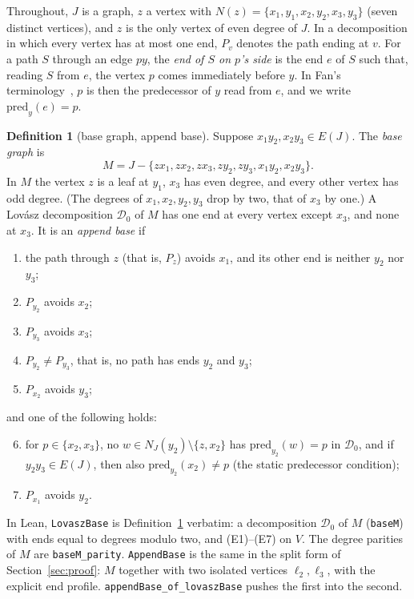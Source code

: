 \documentclass[11pt]{amsart}
\theoremstyle{definition}
\newtheorem{definition}[theorem]{Definition}
\newcommand{\cD}{\mathcal D}
\begin{document}
Throughout, $J$ is a graph, $z$ a vertex with $N(z)=\{x_1,y_1,x_2,y_2,x_3,y_3\}$ (seven distinct
vertices), and $z$ is the only vertex of even degree of $J$. In a decomposition in which every
vertex has at most one end, $P_v$ denotes the path ending at $v$. For a path $S$ through an edge
$py$, the \emph{end of $S$ on $p$'s side} is the end $e$ of $S$ such that, reading $S$ from $e$,
the vertex $p$ comes immediately before $y$. In Fan's terminology~\cite{Fan05,TF}, $p$ is then
the predecessor of $y$ read from $e$, and we write $\mathrm{pred}_y(e)=p$.

\begin{definition}[base graph, append base]\label{def:base}
Suppose $x_1y_2,x_2y_3\in E(J)$. The \emph{base graph} is
\[
M=J-\{zx_1,zx_2,zx_3,zy_2,zy_3,x_1y_2,x_2y_3\}.
\]
In $M$ the vertex $z$ is a leaf at $y_1$, $x_3$ has even degree, and every other vertex has odd
degree. (The degrees of $x_1,x_2,y_2,y_3$ drop by two, that of $x_3$ by one.) A Lov\'asz
decomposition $\cD_0$ of $M$ has one end at every vertex except $x_3$, and none at $x_3$. It is an
\emph{append base} if
\begin{enumerate}[label=\textup{(E\arabic*)}]
\item the path through $z$ (that is, $P_z$) avoids $x_1$, and its other end is neither $y_2$
nor $y_3$;
\item $P_{y_2}$ avoids $x_2$;
\item $P_{y_3}$ avoids $x_3$;
\item $P_{y_2}\ne P_{y_3}$, that is, no path has ends $y_2$ and $y_3$;
\item $P_{x_2}$ avoids $y_3$;
\end{enumerate}
and one of the following holds:
\begin{enumerate}[label=\textup{(E\arabic*)}]\setcounter{enumi}{5}
\item for $p\in\{x_2,x_3\}$, no $w\in N_J(y_2)\setminus\{z,x_2\}$ has $\mathrm{pred}_{y_2}(w)=p$
in $\cD_0$, and if $y_2y_3\in E(J)$, then also $\mathrm{pred}_{y_2}(x_2)\ne p$ (the static
predecessor condition);
\item $P_{x_1}$ avoids $y_2$.
\end{enumerate}
\end{definition}

In Lean, \texttt{LovaszBase} is Definition~\ref{def:base} verbatim: a decomposition
$\cD_0$ of $M$ (\texttt{baseM}) with ends equal to degrees modulo two, and (E1)--(E7) on $V$. The
degree parities of $M$ are \texttt{baseM\_parity}. \texttt{AppendBase} is the same in the split
form of Section~\ref{sec:proof}: $M$ together with two isolated vertices $\ell_2,\ell_3$, with
the explicit end profile. \texttt{appendBase\_of\_lovaszBase} pushes the first into the second.
\end{document}
